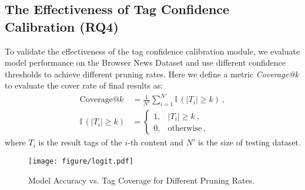 \subsection{The Effectiveness of Tag Confidence Calibration (RQ4)}
To validate the effectiveness of the tag confidence calibration module, we evaluate model performance on the Browser News Dataset and use different confidence thresholds to achieve different pruning rates. Here we define a metric \textit{Coverage@k} to evaluate the cover rate of final results as:
\begin{equation}
\begin{aligned}
\text{Coverage}@k &= \frac{1}{N'} \sum_{i=1}^{N'} \mathbb{I}\,{\left(|T_i| \geq k\right)}~,\\
\mathbb{I}\,{\left(|T_i| \geq k\right)}&= \begin{cases}
1, & |T_i| \geq k~,\\
0, &  \text{otherwise}~,
\end{cases}
\end{aligned}
\end{equation}
where $T_i$ is the result tags of the $i$-th content and $N'$ is the size of testing dataset. 


\begin{figure}[h]
\centering
\texttt{[image: figure/logit.pdf]}
\caption{Model Accuracy vs. Tag Coverage for Different Pruning Rates.}
\label{fig:logit}
\end{figure}



